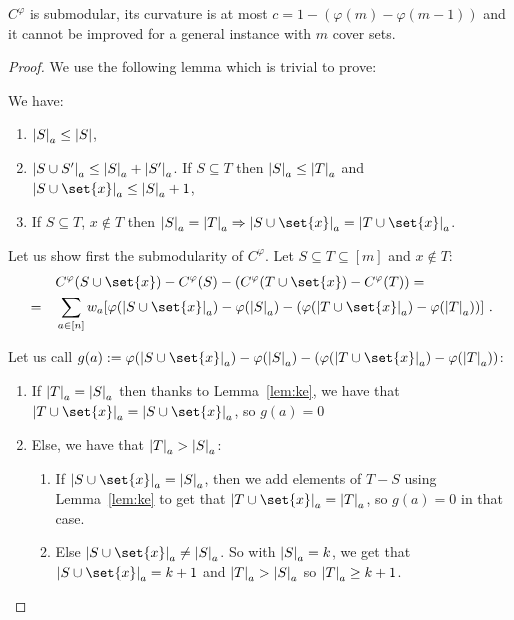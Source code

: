 \begin{proposition}
  $C^{\varphi}$ is submodular, its curvature is at most $c = 1 - (\varphi(m) - \varphi(m-1))$ and it cannot be improved for a general instance with $m$ cover sets.
  \label{prop:SubCurv}
\end{proposition}

\begin{proof}

  We use the following lemma which is trivial to prove:

  \begin{lemma}[Properties of $\abs{S}_a = \abs{\set{i \in S : a \in T_i}}$.]
    We have:
  \begin{enumerate}
  \item $\abs{S}_a \leq \abs{S}$,
  \item $\abs{S \cup S'}_a\leq \abs{S}_a + \abs{S'}_a$. If $S \subseteq T$ then $\abs{S}_a \leq \abs{T}_a$ and $\abs{S\cup\set{x}}_a \leq \abs{S}_a + 1$,
  \item If $S \subseteq T$, $x \not\in T$ then $\abs{S}_a = \abs{T}_a \Rightarrow \abs{S\cup\set{x}}_a = \abs{T\cup\set{x}}_a$.
  \end{enumerate}
  \label{lem:ke}
\end{lemma}
  
  Let us show first the submodularity of $C^{\varphi}$. Let $S \subseteq T \subseteq [m]$ and $x \not\in T$:
  \begin{equation}
    \begin{aligned}
      &&& C^{\varphi}(S \cup \set{x}) - C^{\varphi}(S) - (C^{\varphi}(T \cup \set{x}) - C^{\varphi}(T))= \\
      &=&& \sum_{a \in [n]} w_a[\varphi(\abs{S\cup\set{x}}_a) - \varphi(\abs{S}_a) - (\varphi(\abs{T\cup\set{x}}_a) - \varphi(\abs{T}_a))]\ .\\
    \end{aligned}
  \end{equation}

  Let us call $g(a) := \varphi(\abs{S\cup\set{x}}_a) - \varphi(\abs{S}_a) - (\varphi(\abs{T\cup\set{x}}_a) - \varphi(\abs{T}_a))$:
  \begin{enumerate}
  \item If $\abs{T}_a = \abs{S}_a$ then thanks to Lemma~\ref{lem:ke}, we have that $\abs{T\cup\set{x}}_a = \abs{S\cup\set{x}}_a$, so $g(a) = 0$
  \item Else, we have that $\abs{T}_a > \abs{S}_a$:
    \begin{enumerate}
    \item If $\abs{S\cup\set{x}}_a = \abs{S}_a$, then we add elements of $T-S$ using Lemma~\ref{lem:ke} to get that $\abs{T\cup\set{x}}_a = \abs{T}_a$, so $g(a)=0$ in that case.
    \item Else $\abs{S\cup\set{x}}_a \not= \abs{S}_a$. So with $\abs{S}_a = k$, we get that $\abs{S\cup\set{x}}_a = k+1$ and $\abs{T}_a > \abs{S}_a$ so $\abs{T}_a \geq k+1$.


\end{enumerate}
\end{enumerate}
\end{proof}
